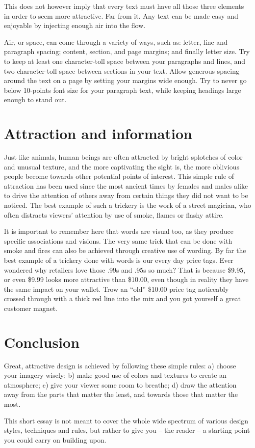 This does not however imply that every text must have all those three elements in
order to seem more attractive. Far from it. Any text can be made easy and
enjoyable by injecting enough air into the flow.

Air, or space, can come through a variety of ways, such as: letter, line and
paragraph spacing; content, section, and page margins; and finally letter size. Try
to keep at least one character-toll space between your paragraphs and lines, and
two character-toll space between sections in your text. Allow generous spacing
around the text on a page by setting your margins wide enough. Try to never go
below 10-points font size for your paragraph text, while keeping headings large
enough to stand out.

\section*{Attraction and information}

Just like animals, human beings are often attracted by bright splotches of color
and unusual texture, and the more captivating the sight is, the more oblivious
people become towards other potential points of interest. This simple rule of
attraction has been used since the most ancient times by females and males
alike to drive the attention of others away from certain things they did not want
to be noticed. The best example of such a trickery is the work of a street
magician, who often distracts viewers’ attention by use of smoke, flames or
flashy attire.

It is important to remember here that words are visual too, as they produce
specific associations and visions. The very same trick that can be done with
smoke and fires can also be achieved through creative use of wording. By far the
best example of a trickery done with words is our every day price tags. Ever
wondered why retailers love those .99s and .95s so much? That is because \$9.95, or
even \$9.99 looks more attractive than \$10.00, even though in reality they
have the same impact on your wallet. Trow an ``old'' \$10.00 price tag noticeably
crossed through with a thick red line into the mix and you got yourself a great
customer magnet.

\section*{Conclusion}

Great, attractive design is achieved by following these simple rules: a) choose
your imagery wisely; b) make good use of colors and textures to create an
atmosphere; c) give your viewer some room to breathe; d) draw the attention
away from the parts that matter the least, and towards those that matter the
most.

This short essay is not meant to cover the whole wide spectrum of various design
styles, techniques and rules, but rather to give you -- the reader -- a starting
point you could carry on building upon.
